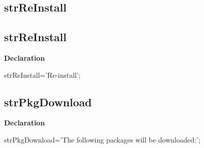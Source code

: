 \documentclass{report}
\newif\ifpdf
\begin{document}
\subsection*{\large{\textbf{strReInstall}}\normalsize\hspace{1ex}\hrulefill}
\else
\subsection*{strReInstall}
\fi
\label{trstrings-strReInstall}
\begin{list}{}{
\setlength{\itemindent}{0cm}
\setlength{\listparindent}{0cm}
\setlength{\leftmargin}{\evensidemargin}
\addtolength{\leftmargin}{\tmplength}
\settowidth{\labelsep}{X}
\addtolength{\leftmargin}{\labelsep}
\setlength{\labelwidth}{\tmplength}
}
\item[\textbf{Declaration}\hfill]
\ifpdf
\begin{flushleft}
\fi
\begin{ttfamily}
strReInstall='Re-install';\end{ttfamily}

\ifpdf
\end{flushleft}
\fi

\end{list}
\ifpdf
\subsection*{\large{\textbf{strPkgDownload}}\normalsize\hspace{1ex}\hrulefill}
\else
\subsection*{strPkgDownload}
\fi
\label{trstrings-strPkgDownload}
\begin{list}{}{
\setlength{\itemindent}{0cm}
\setlength{\listparindent}{0cm}
\setlength{\leftmargin}{\evensidemargin}
\addtolength{\leftmargin}{\tmplength}
\settowidth{\labelsep}{X}
\addtolength{\leftmargin}{\labelsep}
\setlength{\labelwidth}{\tmplength}
}
\item[\textbf{Declaration}\hfill]
\ifpdf
\begin{flushleft}
\fi
\begin{ttfamily}
strPkgDownload='The following packages will be downloaded:';\end{ttfamily}

\ifpdf
\end{flushleft}
\fi

\end{list}
\ifpdf
\end{document}
